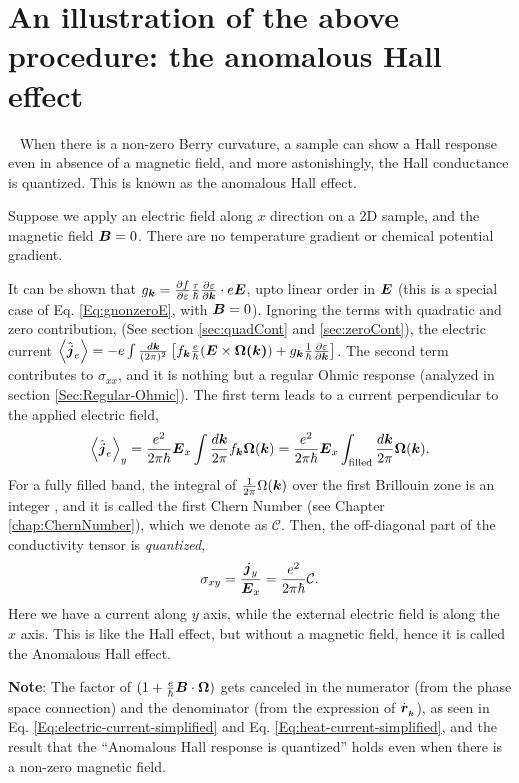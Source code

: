 \documentclass{report}
\renewcommand\vec[1]{\ensuremath\boldsymbol{#1}} %
\begin{document}
\section{An illustration of the above procedure: the anomalous Hall effect}~\label{sec:AHE}
When there is a non-zero Berry curvature, a sample can show a Hall response even in absence of a magnetic field, and more astonishingly, the Hall conductance is quantized. This is known as the anomalous Hall effect.

Suppose we apply an electric field along $x$ direction on a 2D sample, and the magnetic field $\vec{B} = 0$. There are no temperature gradient or chemical potential gradient.

It can be shown that  $g_{\vec{k}} = \frac{\partial f} {\partial \varepsilon}
\frac{\tau}{\hbar} \frac{\partial \varepsilon}{\partial \vec{k}}\cdot e \vec{E}$, upto linear order in $\vec{E}$ (this is a special case of Eq. \eqref{Eq:gnonzeroE}, with $\vec{B} = 0$). Ignoring the terms with quadratic and zero contribution, (See section \ref{sec:quadCont} and \ref{sec:zeroCont}), the electric current $\expval{\hat{\vec{j}}_e} = -e \int \frac{d\vec{k}}{(2\pi)^2} \left[{f}_{\vec{k}} \frac{e}{\hbar} (\vec{E}\times\vec{\Omega(\vec{k})}) + {g}_{\vec{k}} \frac{1}{\hbar} \frac{\partial \varepsilon}{\partial \vec{k}}\right] $. The second term contributes to $\sigma_{xx}$, and it is nothing but a regular Ohmic response (analyzed in section \ref{Sec:Regular-Ohmic}). The first term leads to a current perpendicular to the applied electric field,
$$\expval{\hat{\vec{j}}_e}_y = \frac{e^2}{2 \pi \hbar} \vec{E}_x \int \frac{d\vec{k}}{2\pi} {f}_{\vec{k}} \vec{\Omega}(\vec{k}) = \frac{e^2}{2 \pi \hbar} \vec{E}_x \int_{\text{filled}} \frac{d\vec{k}}{2\pi} \vec{\Omega}(\vec{k}).$$
For a fully filled band, the integral of $\frac{1}{2\pi}\Omega(\vec{k})$ over the first Brillouin zone is an integer \cite{cite:something}, and it is called the first Chern Number (see Chapter \ref{chap:ChernNumber}), which we denote as $\mathcal{C}$. Then, the off-diagonal part of the conductivity tensor is \textit{quantized},
$$\sigma_{xy} = \frac{\vec{j}_y}{\vec{E}_x} = \frac{e^2}{2\pi \hbar} \mathcal{C}.$$
Here we have a current along $y$ axis, while the external electric field is along the $x$ axis. This is like the Hall effect, but without a magnetic field, hence it is called the Anomalous Hall effect.

\textbf{Note}: The factor of $(1 + \frac{e}{\hbar} \vec{B}\cdot\vec{\Omega})$ gets canceled in the numerator (from the phase space connection) and the denominator (from the expression of $\dot{\vec{r}}_{_{\vec{k}}}$), as seen in Eq. \eqref{Eq:electric-current-simplified} and Eq. \eqref{Eq:heat-current-simplified}, and the result that the ``Anomalous Hall response is quantized'' holds even when there is a non-zero magnetic field.
 
\end{document}
